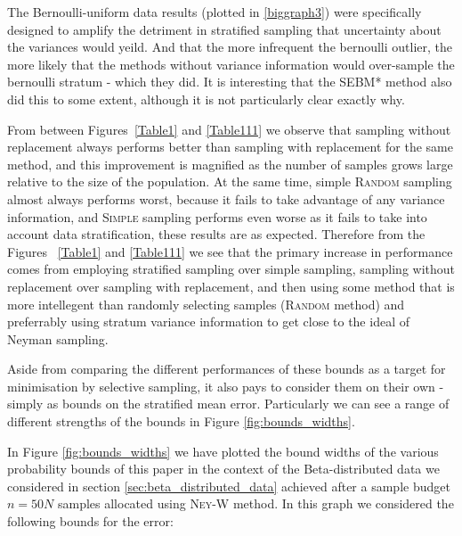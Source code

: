 The Bernoulli-uniform data results (plotted in \ref{biggraph3}) were specifically designed to amplify the detriment in stratified sampling that uncertainty about the variances would yeild.
And that the more infrequent the bernoulli outlier, the more likely that the methods without variance information would over-sample the bernoulli stratum - which they did.
It is interesting that the SEBM* method also did this to some extent, although it is not particularly clear exactly why.


From between Figures~\ref{Table1} and \ref{Table111} we observe that sampling without replacement always performs better than sampling with replacement for the same method, and this improvement is magnified as the number of samples grows large relative to the size of the population. 
At the same time, simple \textsc{Random} sampling almost always performs worst, because it fails to take advantage of any variance information, and \textsc{Simple} sampling performs even worse as it fails to take into account data stratification, these results are as expected.
Therefore from the Figures ~\ref{Table1} and \ref{Table111} we see that the primary increase in performance comes from employing stratified sampling over simple sampling, sampling without replacement over sampling with replacement, and then using some method that is more intellegent than randomly selecting samples (\textsc{Random} method) and preferrably using stratum variance information to get close to the ideal of Neyman sampling.

Aside from comparing the different performances of these bounds as a target for minimisation by selective sampling, it also pays to consider them on their own - simply as bounds on the stratified mean error.
Particularly we can see a range of different strengths of the bounds in Figure \ref{fig:bounds_widths}.

In Figure \ref{fig:bounds_widths} we have plotted the bound widths of the various probability bounds of this paper in the context of the Beta-distributed data we considered in section \ref{sec:beta_distributed_data} achieved after a sample budget $n=50N$ samples allocated using \textsc{Ney-W} method.
In this graph we considered the following bounds for the error:

